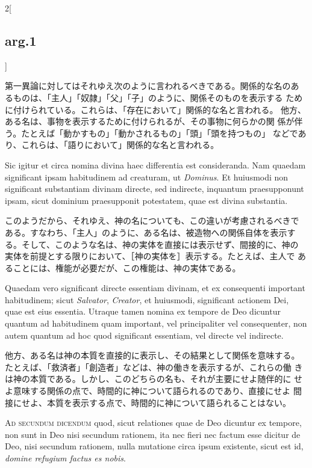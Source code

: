 \documentclass[paper=a4paper,fontsize=10pt,jafontsize=9pt,titlepage]{jlreq}
\begin{document}
\begin{paracol}{2}[\subsection{arg.1}]
\switchcolumn

第一異論に対してはそれゆえ次のように言われるべきである。関係的な名のあ
るものは、「主人」「奴隷」「父」「子」のように、関係そのものを表示する
ために付けられている。これらは、「存在において」関係的な名と言われる。
他方、ある名は、事物を表示するために付けられるが、その事物に何らかの関
係が伴う。たとえば「動かすもの」「動かされるもの」「頭」「頭を持つもの」
などであり、これらは、「語りにおいて」関係的な名と言われる。

\switchcolumn*

Sic igitur et circa nomina divina haec differentia est
consideranda. Nam quaedam significant ipsam habitudinem ad creaturam,
ut {\itshape Dominus}. Et huiusmodi non significant substantiam
divinam directe, sed indirecte, inquantum praesupponunt ipsam, sicut
dominium praesupponit potestatem, quae est divina substantia.

\switchcolumn

このようだから、それゆえ、神の名についても、この違いが考慮されるべきで
ある。すなわち、「主人」のように、ある名は、被造物への関係自体を表示す
る。そして、このような名は、神の実体を直接には表示せず、間接的に、神の
実体を前提とする限りにおいて、［神の実体を］表示する。たとえば、主人で
あることには、権能が必要だが、この権能は、神の実体である。

\switchcolumn*

Quaedam vero significant directe essentiam divinam, et ex consequenti
important habitudinem; sicut {\itshape Salvator}, {\itshape Creator},
et huiusmodi, significant actionem Dei, quae est eius
essentia. Utraque tamen nomina ex tempore de Deo dicuntur quantum ad
habitudinem quam important, vel principaliter vel consequenter, non
autem quantum ad hoc quod significant essentiam, vel directe vel
indirecte.

\switchcolumn

他方、ある名は神の本質を直接的に表示し、その結果として関係を意味する。
たとえば、「救済者」「創造者」などは、神の働きを表示するが、これらの働
きは神の本質である。しかし、このどちらの名も、それが主要にせよ随伴的に
せよ意味する関係の点で、時間的に神について語られるのであり、直接にせよ
間接にせよ、本質を表示する点で、時間的に神について語られることはない。

\switchcolumn*[\subsection{ad.2}]

{\scshape Ad secundum dicendum} quod, sicut relationes quae de Deo
dicuntur ex tempore, non sunt in Deo nisi secundum rationem, ita nec
fieri nec factum esse dicitur de Deo, nisi secundum rationem, nulla
mutatione circa ipsum existente, sicut est id, {\itshape domine
refugium factus es nobis}.


\end{paracol}
\end{document}
